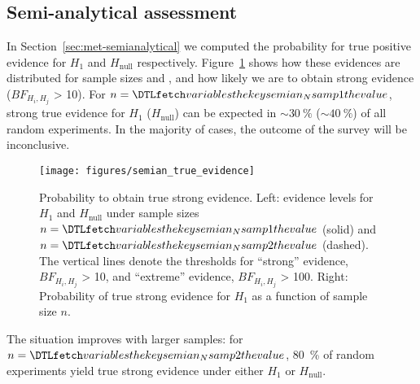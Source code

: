 \documentclass[twocolumn,twocolappendix,linenumbers]{aastex631}
\begin{document}

\subsection{Semi-analytical assessment}\label{sec:results-semianalytical}
In Section~\ref{sec:met-semianalytical} we computed the probability for true positive evidence for $H_\mathrm{1}$ and $H_\mathrm{null}$ respectively.
Figure~\ref{fig:semian_true_evidence} shows how these evidences are distributed for sample sizes  and , and how likely we are to obtain strong evidence ($BF_{H_i, H_j}$ > 10).
For $n = \var{semian_Nsamp1}$, strong true evidence for $H_\mathrm{1}$ ($H_\mathrm{null}$) can be expected in $\sim \SI{30}{\percent}$ ($\sim \SI{40}{\percent}$) of all random experiments.
In the majority of cases, the outcome of the survey will be inconclusive.
\begin{figure*}
    \begin{centering}
        \texttt{[image: figures/semian\_true\_evidence]}
        \caption{Probability to obtain true strong evidence. Left: evidence levels for $H_\mathrm{1}$ and $H_\mathrm{null}$ under sample sizes $n = \var{semian_Nsamp1}$ (solid) and $n = \var{semian_Nsamp2}$ (dashed). The vertical lines denote the thresholds for ``strong'' evidence, $BF_{H_i, H_j}$ > 10, and ``extreme'' evidence, $BF_{H_i, H_j}$ > 100. Right: Probability of true strong evidence for $H_\mathrm{1}$ as a function of sample size $n$.}
        \label{fig:semian_true_evidence}
    \end{centering}
\end{figure*}
The situation improves with larger samples: for $n = \var{semian_Nsamp2}$, \SI{80}{\percent} of random experiments yield true strong evidence under either $H_\mathrm{1}$ or $H_\mathrm{null}$.
\end{document}
